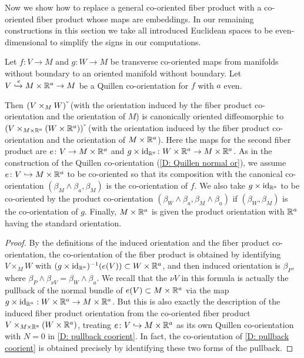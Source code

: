 Now we show how to replace a general co-oriented fiber product with a co-oriented fiber product whose maps are embeddings.
In our remaining constructions in this section we take all introduced Euclidean spaces to be even-dimensional to simplify the signs in our computations.

\begin{lemma}
	Let $f \colon V \to M$ and $g \colon W \to M$ be transverse co-oriented maps from manifolds without boundary to an oriented manifold without boundary.
	Let $V\xhookrightarrow{e}M \times \mathbb{R}^a \to M$ be a Quillen co-orientation for $f$ with $a$ even.

	Then $(V \times_M W)\,\check{\vrule height1.3ex width0pt}$ (with the orientation induced by the fiber product co-orientation and the orientation of $M$) is canonically oriented diffeomorphic to $(V\times_{M \times \R^a }(W \times \R^a ))\,\check{\vrule height1.3ex width0pt}$ (with the orientation induced by the fiber product co-orientation and the orientation of $M \times \mathbb{R}^a $).
	Here the maps for the second fiber product are $e \colon V \to M \times \mathbb{R}^a $ and $g \times \mathrm{id}_{\mathbb{R}^a } \colon W \times \mathbb{R}^a \to M \times \mathbb{R}^a $.
	As in the construction of the Quillen co-orientation (\cref{D: Quillen normal or}), we assume $e \colon V \hookrightarrow M \times \mathbb{R}^a $ to be co-oriented so that its composition with the canonical co-orientation $(\beta_{M}\wedge\beta_a,\beta_M)$ is the co-orientation of $f$.
	We also take $g \times \mathrm{id}_{\mathbb{R}^a }$ to be co-oriented by the product co-orientation $(\beta_W \wedge \beta_a,\beta_M \wedge \beta_a)$ if $(\beta_W,\beta_M)$ is the co-orientation of $g$.
	Finally, $M \times \mathbb{R}^a $ is given the product orientation with $\mathbb{R}^a $ having the standard orientation.
\end{lemma}

\begin{proof}
	By the definitions of the induced orientation and the fiber product co-orientation, the co-orientation of the fiber product is obtained by identifying $V \times_M W$ with $(g\times \mathrm{id}_{\mathbb{R}^a})^{-1}(e(V)) \subset W \times \mathbb{R}^a$, and then induced orientation is $\beta_P$, where $\beta_P \wedge \beta_{\nu V} = \beta_W \wedge \beta_a$.
	We recall that the $\nu V$ in this formula is actually the pullback of the normal bundle of $e(V) \subset M \times \mathbb{R}^a $ via the map $g \times \mathrm{id}_{\mathbb{R}^a }: W \times \mathbb{R}^a \to M \times \mathbb{R}^a $.
	But this is also exactly the description of the induced fiber product orientation from the co-oriented fiber product $V\times_{M \times \mathbb{R}^a }(W \times \mathbb{R}^a )$, treating $e \colon V \hookrightarrow M \times \mathbb{R}^a $ as its own Quillen co-orientation with $N = 0$ in \cref{D: pullback coorient}.
	In fact, the co-orientation of \cref{D: pullback coorient} is obtained precisely by identifying these two forms of the pullback.
\end{proof}

